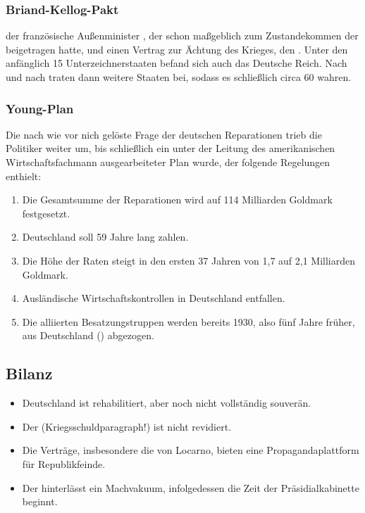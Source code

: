 \subsubsection{Briand-Kellog-Pakt}

 der französische Außenminister , der schon maßgeblich zum Zustandekommen
der  beigetragen hatte, und
 einen
Vertrag zur Ächtung des Krieges, den . Unter
den anfänglich 15 Unterzeichnerstaaten befand sich auch das Deutsche
Reich. Nach und nach traten dann weitere Staaten bei, sodass es
schließlich circa 60 wahren.


\subsubsection{Young-Plan}

Die nach wie vor nich gelöste Frage der deutschen Reparationen trieb
die Politiker weiter um, bis schließlich  ein unter der
Leitung des amerikanischen Wirtschaftsfachmann  ausgearbeiteter Plan  
wurde, der folgende Regelungen enthielt:

\begin{enumerate}
\item Die Gesamtsumme der Reparationen wird auf 114 Milliarden
Goldmark festgesetzt.
\item Deutschland soll 59 Jahre lang zahlen.
\item Die Höhe der Raten steigt in den ersten 37 Jahren von 1,7 auf
2,1 Milliarden Goldmark.
\item Ausländische Wirtschaftskontrollen in Deutschland entfallen.
\item Die alliierten Besatzungstruppen werden bereits 1930, also fünf
Jahre früher, aus Deutschland () abgezogen.
\end{enumerate}


\subsection*{Bilanz}

\begin{itemize}
\item Deutschland ist rehabilitiert, aber noch nicht vollständig
souverän. 
\item Der  (Kriegsschuldparagraph!) ist
nicht revidiert.
\item Die Verträge, insbesondere die von Locarno, bieten eine
Propagandaplattform für Republikfeinde.
\item Der  hinterlässt ein Machvakuum,
infolgedessen die Zeit der Präsidialkabinette beginnt.
\end{itemize}


\endinput
